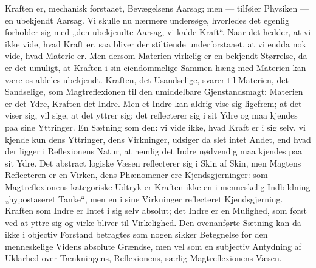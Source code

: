 \documentclass[12pt,a4paper]{book}
\begin{document}
Kraften er, mechanisk forstaaet, Bevægelsens Aarsag; men --- tilføier
Physiken --- en ubekjendt Aarsag. Vi skulle nu nærmere undersøge,
hvorledes det egenlig forholder sig med „den ubekjendte Aarsag, vi
kalde Kraft“. Naar det hedder, at vi ikke vide, hvad Kraft er, saa
bliver der stiltiende underforstaaet, at vi endda nok vide, hvad
Materie er. Men dersom Materien virkelig er en bekjendt Størrelse, da
er det umuligt, at Kraften i sin eiendommelige Sammen\-%
hæng med Materien kan være os aldeles ubekjendt. Kraften, det
Usandselige, svarer til Materien, det Sandselige, som Magtreflexionen
til den umiddelbare Gjenstandsmagt: Materien er det Ydre, Kraften det
Indre. Men et Indre kan aldrig vise sig ligefrem; at det viser sig,
vil sige, at det yttrer sig; det reflecterer sig i sit Ydre og maa
kjendes paa sine Yttringer. En Sætning som den: vi vide ikke, hvad
Kraft er i sig selv, vi kjende kun dens Yttringer, dens Virkninger,
udsiger da slet intet Andet, end hvad der ligger i Reflexionens Natur,
at nemlig det Indre nødvendig maa kjendes paa sit Ydre. Det abstract
logiske Væsen reflecterer sig i Skin af Skin, men Magtens Reflecteren
er en Virken, dens Phænomener ere Kjendsgjerninger: som
Magtreflexionens kategoriske Udtryk er Kraften ikke en i menneskelig
Indbildning „hypostaseret Tanke“, men en i sine Virkninger reflecteret
Kjendsgjerning. Kraften som Indre er Intet i sig selv absolut; det
Indre er en Mulighed, som først ved at yttre sig og virke bliver til
Virkelighed. Den ovenanførte Sætning kan da ikke i objectiv Forstand
betragtes som nogen sikker Betegnelse for den menneskelige Videns
absolute Grændse, men vel som en subjectiv Antydning af Uklarhed over
Tænkningens, Reflexionens, særlig Magtreflexionens Væsen.
\end{document}
